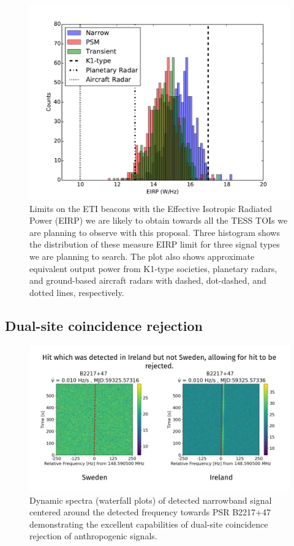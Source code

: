 \documentclass{aastex63}
\begin{document}
\begin{figure}
    \centering
    \includegraphics[scale=0.5]{Dist_EIRP.pdf}
    \caption{Limits on the ETI beacons with the Effective Isotropic Radiated Power (EIRP) we are likely to obtain towards all the TESS TOIs we are planning to observe with this proposal. Three histogram shows the distribution of these measure EIRP limit for three signal types we are planning to search. The plot also shows approximate equivalent output power from K1-type societies, planetary radars, and ground-based aircraft radars with dashed, dot-dashed, and dotted lines, respectively.}
    \label{fig:EIRP}
\end{figure}

\subsection{Dual-site coincidence rejection}
\begin{figure}[ht]
    \centering
    \includegraphics[scale=0.5]{dual_site_rejection_ex.png}
    \caption{Dynamic spectra (waterfall plots) of detected narrowband signal centered around the detected frequency towards PSR B2217+47 demonstrating the excellent capabilities of dual-site coincidence rejection of anthropogenic signals.}
    \label{fig:dual_site_SETI}
\end{figure}
\end{document}
